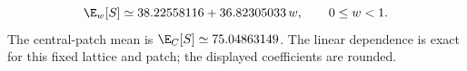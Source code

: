 \begin{equation}
 \E_w[S]\simeq 38.22558116+36.82305033\,w,\qquad 0\leq w<1.
 \label{eq:linearresponse}
\end{equation}
The central-patch mean is $\E_C[S]\simeq 75.04863149$. The linear dependence is exact for this fixed lattice and patch; the displayed coefficients are rounded.
